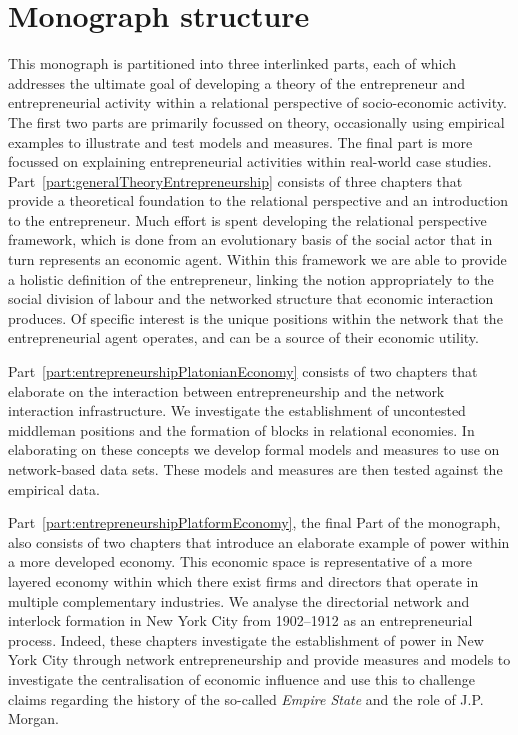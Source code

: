 \section{Monograph structure}

This monograph is partitioned into three interlinked parts, each of which addresses the ultimate goal of developing a theory of the entrepreneur and entrepreneurial activity within a relational perspective of socio-economic activity. The first two parts are primarily focussed on theory, occasionally using empirical examples to illustrate and test models and measures. The final part is more focussed on explaining entrepreneurial activities within real-world case studies. Part~\ref{part:generalTheoryEntrepreneurship} consists of three chapters that provide a theoretical foundation to the relational perspective and an introduction to the entrepreneur. Much effort is spent developing the relational perspective framework, which is done from an evolutionary basis of the social actor that in turn represents an economic agent. Within this framework we are able to provide a holistic definition of the entrepreneur, linking the notion appropriately to the social division of labour and the networked structure that economic interaction produces. Of specific interest is the unique positions within the network that the entrepreneurial agent operates, and can be a source of their economic utility.

Part~\ref{part:entrepreneurshipPlatonianEconomy} consists of two chapters that elaborate on the interaction between entrepreneurship and the network interaction infrastructure. We investigate the establishment of uncontested middleman positions and the formation of blocks in relational economies. In elaborating on these concepts we develop formal models and measures to use on network-based data sets. These models and measures are then tested against the empirical data.

Part~\ref{part:entrepreneurshipPlatformEconomy}, the final Part of the monograph, also consists of two chapters that introduce an elaborate example of power within a more developed economy. This economic space is representative of a more layered economy within which there exist firms and directors that operate in multiple complementary industries. We analyse the directorial network and interlock formation in New York City from 1902--1912 as an entrepreneurial process. Indeed, these chapters investigate the establishment of power in New York City through network entrepreneurship and provide measures and models to investigate the centralisation of economic influence and use this to challenge claims regarding the history of the so-called \emph{Empire State} and the role of J.P. Morgan.
